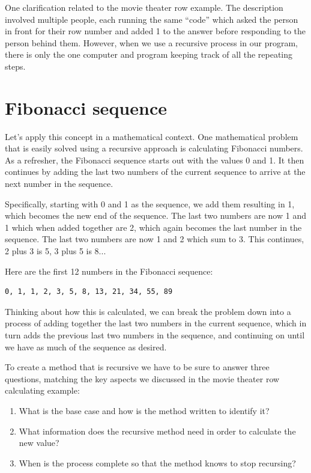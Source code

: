 One clarification related to the movie theater row example. The description involved multiple people, each running the same ``code'' which asked the person in front for their row number and added 1 to the answer before responding to the person behind them. However, when we use a recursive process in our program, there is only the one computer and program keeping track of all the repeating steps.

\section{Fibonacci sequence}    

Let's apply this concept in a mathematical context. One mathematical problem that is easily solved using a recursive approach is calculating Fibonacci numbers. As a refresher, the Fibonacci sequence starts out with the values 0 and 1. It then continues by adding the last two numbers of the current sequence to arrive at the next number in the sequence.

Specifically, starting with 0 and 1 as the sequence, we add them resulting in 1, which becomes the new end of the sequence. The last two numbers are now 1 and 1 which when added together are 2, which again becomes the last number in the sequence. The last two numbers are now 1 and 2 which sum to 3. This continues, 2 plus 3 is 5, 3 plus 5 is 8...

Here are the first 12 numbers in the Fibonacci sequence:

\beforeverb
\begin{verbatim}
0, 1, 1, 2, 3, 5, 8, 13, 21, 34, 55, 89
\end{verbatim}

Thinking about how this is calculated, we can break the problem down into a process of adding together the last two numbers in the current sequence, which in turn adds the previous last two numbers in the sequence, and continuing on until we have as much of the sequence as desired.

To create a method that is recursive we have to be sure to answer three questions, matching the key aspects we discussed in the movie theater row calculating example:

\begin{enumerate}
	\item What is the base case and how is the method written to identify it?
		
	\item What information does the recursive method need in order to calculate the new value?
	
	\item When is the process complete so that the method knows to stop recursing?
\end{enumerate}

